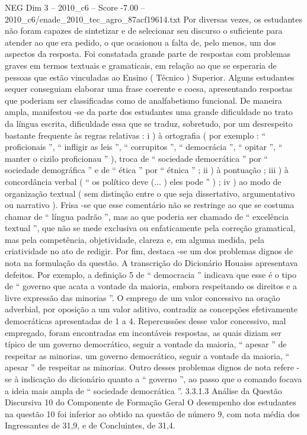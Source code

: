 \begin{textsample}{NEG Dim 3 – 2010\_c6 – Score -7.00 – 2010\_c6/enade\_2010\_tec\_agro\_87acf19614.txt}
Por diversas vezes, os estudantes não foram capazes de sintetizar e de selecionar seu discurso o suficiente para atender ao que era pedido, o que ocasionou a falta de, pelo menos, um dos aspectos da resposta.
Foi constatada grande parte de respostas com problemas graves em termos textuais e gramaticais, em relação ao que se esperaria de pessoas que estão vinculadas ao Ensino ( Técnico ) Superior.
Alguns estudantes sequer conseguiam elaborar uma frase coerente e coesa, apresentando respostas que poderiam ser classificadas como de analfabetismo funcional.
De maneira ampla, manifestou -se da parte dos estudantes uma grande dificuldade no trato da língua escrita, dificuldade essa que se traduz, sobretudo, por um desrespeito bastante frequente às regras relativas : i ) à ortografia ( por exemplo : “ proficionais ”, “ infligir as leis ”, “ corrupitos ”, “ democrácia ”, “ opitar ”, “ manter o cizilo proficionau ” ), troca de “ sociedade democrática ” por “ sociedade demográfica ” e de “ ética ” por “ étnica ” ; ii ) à pontuação ; iii ) à concordância verbal ( “ os político deve (... ) eles pode ” ) ; iv ) ao modo de organização textual ( sem distinção entre o que seja dissertativo, argumentativo ou narrativo ).
Frisa -se que esse comentário não se restringe ao que se costuma chamar de “ língua padrão ”, mas ao que poderia ser chamado de “ excelência textual ”, que não se mede exclusiva ou enfaticamente pela correção gramatical, mas pela competência, objetividade, clareza e, em alguma medida, pela criatividade no ato de redigir.
Por fim, destaca -se um dos problemas dignos de nota na formulação da questão.
A transcrição do Dicionário Houaiss apresentava defeitos.
Por exemplo, a definição 5 de “ democracia ” indicava que esse é o tipo de “ governo que acata a vontade da maioria, embora respeitando os direitos e a livre expressão das minorias ”.
O emprego de um valor concessivo na oração adverbial, por oposição a um valor aditivo, contradiz as concepções efetivamente democráticas apresentadas de 1 a 4.
Repercussões desse valor concessivo, mal empregado, foram encontradas em incontáveis respostas, as quais diziam ser típico de um governo democrático, seguir a vontade da maioria, “ apesar ” de respeitar as minorias. um governo democrático, seguir a vontade da maioria, “ apesar ” de respeitar as minorias.
Outro desses problemas dignos de nota refere -se à indicação do dicionário quanto a “ governo ”, ao passo que o comando focava a ideia mais ampla de “ sociedade democrática ”. 3.3.1.3 Análise da Questão Discursiva 10 do Componente de Formação Geral O desempenho dos estudantes na questão 10 foi inferior ao obtido na questão de número 9, com nota média dos Ingressantes de 31,9, e de Concluintes, de 31,4.

\end{textsample}
